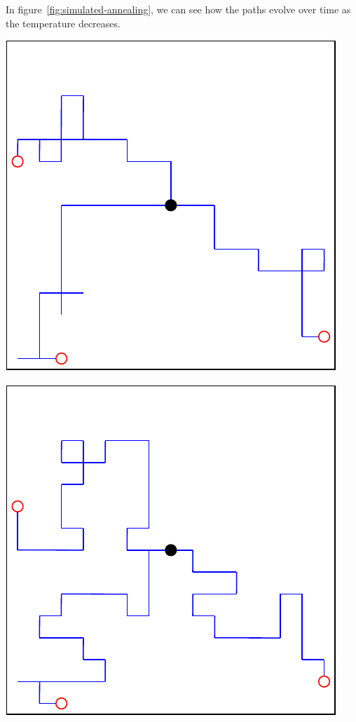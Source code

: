 In figure~\ref{fig:simulated-annealing}, we can see how the paths evolve over time as the temperature decreases.
\begin{center}
    \captionsetup{type=figure}
    \begin{minipage}{.5\textwidth}
        \centering
        \includegraphics[width=0.95\linewidth]{img/SA initial state.pdf}
    \end{minipage}%
    \begin{minipage}{.5\textwidth}
        \centering
        \includegraphics[width=0.95\linewidth]{img/SA temp 2.pdf}

\end{minipage}
\end{center}
